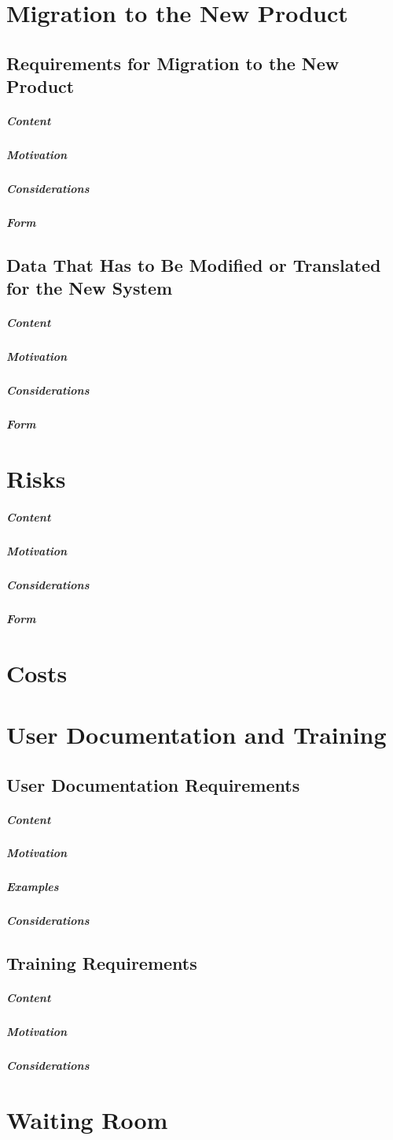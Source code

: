 \documentclass{article}
\begin{document}
\section{Migration to the New Product}

\subsection{Requirements for Migration to the New Product}
\subparagraph{Content}
\subparagraph{Motivation}
\subparagraph{Considerations}
\subparagraph{Form}

\subsection{Data That Has to Be Modified or Translated for the New System}
\subparagraph{Content}
\subparagraph{Motivation}
\subparagraph{Considerations}
\subparagraph{Form}

\section{Risks}

\subparagraph{Content}
\subparagraph{Motivation}
\subparagraph{Considerations}
\subparagraph{Form}

\section{Costs}

\section{User Documentation and Training}

\subsection{User Documentation Requirements}
\subparagraph{Content}
\subparagraph{Motivation}
\subparagraph{Examples}
\subparagraph{Considerations}

\subsection{Training Requirements}
\subparagraph{Content}
\subparagraph{Motivation}
\subparagraph{Considerations}

\section{Waiting Room}
\end{document}

